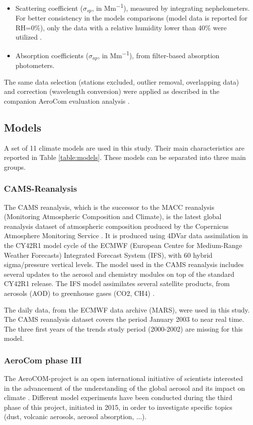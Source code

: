 \documentclass[journal abbreviation, manuscript]{copernicus}
\begin{document}
\begin{itemize}
 \item Scattering coefficient ($\sigma_{sp}$, in \unit{Mm^{-1}}), measured by integrating nephelometers. For better consistency in the models comparisons (model data is reported for RH=0\%), only the data with a relative humidity lower than 40\% were utilized \citep{pandolfi2018european}.
 \item Absorption coefficients ($\sigma_{ap}$, in \unit{Mm^{-1}}), from filter-based absorption photometers.
\end{itemize}

The same data selection (stations excluded, outlier removal, overlapping data) and correction (wavelength conversion) were applied as described in the companion AeroCom evaluation analysis \citep{jonaseval}.

\subsection{Models}
A set of 11 climate models are used in this study. Their main characteristics are reported in Table \ref{table:models}. These models can be separated into three main groups.

\subsubsection{CAMS-Reanalysis}
The CAMS reanalysis, which is the successor to the MACC reanalysis (Monitoring Atmospheric Composition and Climate), is the latest global reanalysis dataset of atmospheric composition produced by the Copernicus Atmosphere Monitoring Service \citep{inness2019cams}. It is produced using 4DVar data assimilation in the CY42R1 model cycle of the ECMWF (European Centre for Medium-Range Weather Forecasts) Integrated Forecast System (IFS), with 60 hybrid sigma/pressure vertical levels. The model used in the CAMS reanalysis includes several updates to the aerosol and chemistry modules on top of the standard CY42R1 release. The IFS model assimilates several satellite products, from aerosols (AOD) to greenhouse gases (CO2, CH4) \cite{inness2019cams}.

The daily data, from the ECMWF data archive (MARS), were used in this study. The CAMS reanalysis dataset covers the period January 2003 to near real time. The three first years of the trends study period (2000-2002) are missing for this model.

\subsubsection{AeroCom phase III}
The AeroCOM-project is an open international initiative of scientists interested in the advancement of the understanding of the global aerosol and its impact on climate \citep{schulz2006radiative}. Different model experiments have been conducted during the third phase of this project, initiated in 2015, in order to investigate specific topics (dust, volcanic aerosols, aerosol absorption, ...). 
\end{document}
